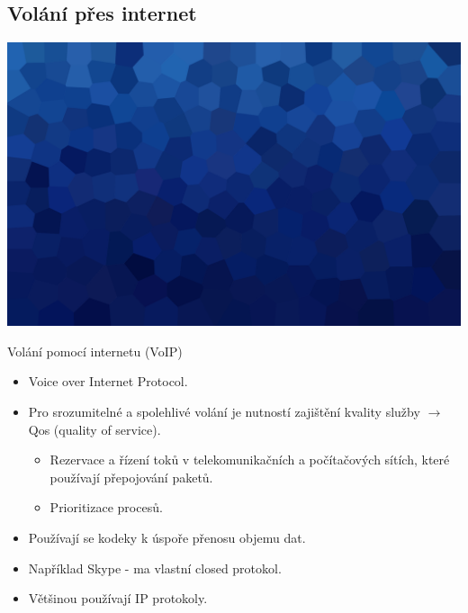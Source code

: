 \documentclass[aspectratio=169,xcolor=dvipsnames, t]{beamer}
\begin{document}
\subsection{Volání přes internet}
{
    \includegraphics[width=\paperwidth,height=\paperheight]{AICStyleData/logos/mene_polygonu_bg.png}
}
\begin{frame}{Volání pomocí internetu (VoIP)}
    \begin{itemize}
        \item Voice over Internet Protocol.
        \item Pro srozumitelné a spolehlivé volání je nutností zajištění kvality služby $\rightarrow$ Qos (quality of service).
        \begin{itemize}
            \item Rezervace a řízení toků v  telekomunikačních a počítačových sítích, které používají přepojování paketů.
            \item Prioritizace procesů.
        \end{itemize}
        \item Používají se kodeky k úspoře přenosu objemu dat.
        \item Například Skype - ma vlastní closed protokol.
        \item Většinou používají IP protokoly.
    \end{itemize}

\end{frame}
\end{document}
